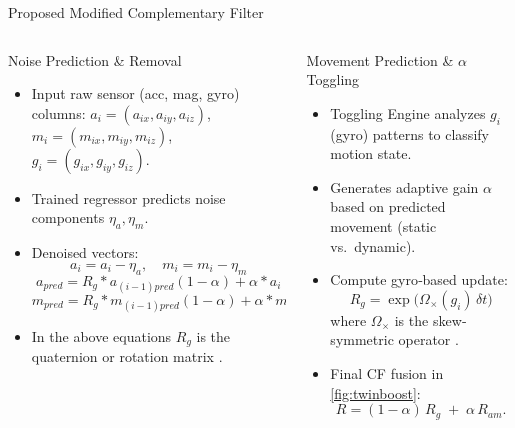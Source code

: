 \documentclass[aspectratio=169,xcolor=dvipsnames]{beamer}
\begin{document}
\begin{frame}{Proposed Modified Complementary Filter}
\scriptsize
\begin{columns}[T]
  \begin{column}{0.48\textwidth}
    \begin{block}{{Noise Prediction \& Removal} \cite{brossard2020openloopCNN}}
      \begin{itemize}
        \item Input raw sensor (acc, mag, gyro) columns: 
          $a_i=(a_{ix},a_{iy},a_{iz})$, 
          $m_i=(m_{ix},m_{iy},m_{iz})$, 
          $g_i=(g_{ix},g_{iy},g_{iz})$.
        \item Trained regressor predicts noise components $\eta_a,\eta_m$.
        \item Denoised vectors:
          \[
            a_i = a_i - \eta_a,\quad
            m_i = m_i - \eta_m 
          \]
          \[
            a_{\textit{pred}} = R_g*a_{(i-1)pred}(1-\alpha) + \alpha*a_i
          \]
          \[
            m_{\textit{pred}} = R_g*m_{(i-1)pred}(1-\alpha) + \alpha*m_i
          \]
        \item In the above equations $R_{g}$ is the quaternion or rotation matrix \cite{black1964passive}\cite{cariow2016hardware}.
      \end{itemize}
    \end{block}
  \end{column}
  \begin{column}{0.48\textwidth}
    \begin{block}{{Movement Prediction \& $\alpha$ Toggling} \cite{vertzberger2022adaptive}}
      \begin{itemize}
        \item Toggling Engine analyzes $g_i$ (gyro) patterns to classify motion state.
        \item Generates adaptive gain $\alpha$ based on predicted movement (static vs.\ dynamic).
        \item Compute gyro‐based update:
        \[
          R_g = \exp\bigl(\Omega_{\times}(g_i)\,\delta t\bigr)
        \]
        where $\Omega_{\times}$ is the skew‐symmetric operator \cite{zhao2016time}.
        \item Final CF fusion in \autoref{fig:twinboost}:
        \[
          R = (1-\alpha)\,R_g \;+\;\alpha\,R_{am}.
        \]
      \end{itemize}
    \end{block}
  \end{column}
\end{columns}
\end{frame}
\end{document}
